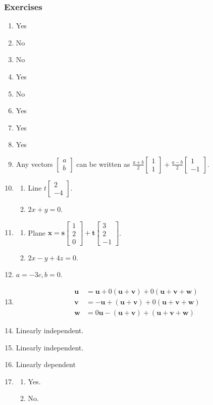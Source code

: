 \documentclass{article}
\newcommand{\vu}{\mathbf{u}}
\newcommand{\vv}{\mathbf{v}}
\newcommand{\vw}{\mathbf{w}}
\newcommand{\vx}{\mathbf{x}}
\newcommand{\colvecTwo}[2]{
  \begin{bmatrix}
    #1 \\
    #2
  \end{bmatrix}
}
\newcommand{\colvecThree}[3]{
  \begin{bmatrix}
    #1 \\
    #2 \\
    #3
  \end{bmatrix}
}
\begin{document}
\subsubsection*{Exercises}
\begin{enumerate}
  \item Yes
  \item No
  \item No
  \item Yes
  \item No
  \item Yes
  \item Yes
  \item Yes
  \item Any vectors $\colvecTwo{a}{b}$ can be written as $\frac{a+b}{2}\colvecTwo{1}{1}+
    \frac{a-b}{2}\colvecTwo{1}{-1}$.
    \setcounter{enumi}{12}
  \item
    \begin{enumerate}
      \item Line $t\colvecTwo{2}{-4}$.
      \item $2x+y=0$.
    \end{enumerate}
    \setcounter{enumi}{14}
  \item
    \begin{enumerate}
      \item Plane $\vx=\mathbf{s}\colvecThree{1}{2}{0}+\mathbf{t}\colvecThree{3}{2}{-1}$.
      \item $2x-y+4z=0$.
    \end{enumerate}
    \setcounter{enumi}{16}
  \item $a=-3c, b=0$.
    \setcounter{enumi}{18}
  \item
    \begin{align*}
      \vu & = \vu+0(\vu+\vv)+0(\vu+\vv+\vw) \\
      \vv & = -\vu+(\vu+\vv)+0(\vu+\vv+\vw) \\
      \vw & = 0\vu-(\vu+\vv)+(\vu+\vv+\vw)
    \end{align*}
    \setcounter{enumi}{21}
  \item Linearly independent.
  \item Linearly independent.
    \setcounter{enumi}{24}
  \item Linearly dependent
    \setcounter{enumi}{42}
  \item
    \begin{enumerate}
      \item Yes.
      \item No.
    \end{enumerate}
\end{enumerate}
\end{document}
